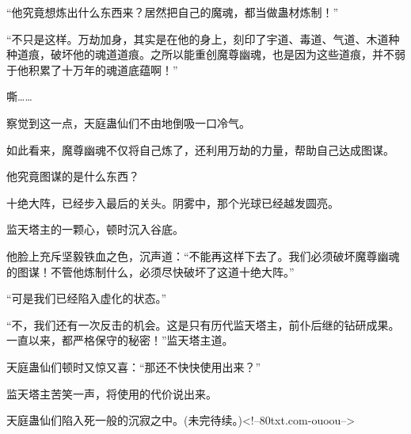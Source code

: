\begin{this_body}
“他究竟想炼出什么东西来？居然把自己的魔魂，都当做蛊材炼制！”

“不只是这样。万劫加身，其实是在他的身上，刻印了宇道、毒道、气道、木道种种道痕，破坏他的魂道道痕。之所以能重创魔尊幽魂，也是因为这些道痕，并不弱于他积累了十万年的魂道底蕴啊！”

嘶……

察觉到这一点，天庭蛊仙们不由地倒吸一口冷气。

如此看来，魔尊幽魂不仅将自己炼了，还利用万劫的力量，帮助自己达成图谋。

他究竟图谋的是什么东西？

十绝大阵，已经步入最后的关头。阴雾中，那个光球已经越发圆亮。

监天塔主的一颗心，顿时沉入谷底。

他脸上充斥坚毅铁血之色，沉声道：“不能再这样下去了。我们必须破坏魔尊幽魂的图谋！不管他炼制什么，必须尽快破坏了这道十绝大阵。”

“可是我们已经陷入虚化的状态。”

“不，我们还有一次反击的机会。这是只有历代监天塔主，前仆后继的钻研成果。一直以来，都严格保守的秘密！”监天塔主道。

天庭蛊仙们顿时又惊又喜：“那还不快快使用出来？”

监天塔主苦笑一声，将使用的代价说出来。

天庭蛊仙们陷入死一般的沉寂之中。(未完待续。)<!--80txt.com-ouoou-->

\end{this_body}

